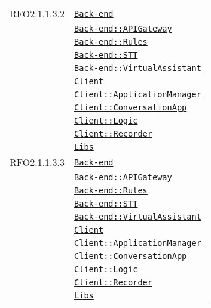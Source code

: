 \begin{longtable}{|>{\centering}m{3cm}|m{10cm}<{\centering}|}
RFO2.1.1.3.2 & \hyperref[Back-end]{\texttt{Back-end}}\\
& \hyperref[Back-end::APIGateway]{\texttt{Back-end::APIGateway}}\\
& \hyperref[Back-end::Rules]{\texttt{Back-end::Rules}}\\
& \hyperref[Back-end::STT]{\texttt{Back-end::STT}}\\
& \hyperref[Back-end::VirtualAssistant]{\texttt{Back-end::VirtualAssistant}}\\
& \hyperref[Client]{\texttt{Client}}\\
& \hyperref[Client::ApplicationManager]{\texttt{Client::ApplicationManager}}\\
& \hyperref[Client::ConversationApp]{\texttt{Client::ConversationApp}}\\
& \hyperref[Client::Logic]{\texttt{Client::Logic}}\\
& \hyperref[Client::Recorder]{\texttt{Client::Recorder}}\\
& \hyperref[Libs]{\texttt{Libs}}\\ \hline

RFO2.1.1.3.3 & \hyperref[Back-end]{\texttt{Back-end}}\\
& \hyperref[Back-end::APIGateway]{\texttt{Back-end::APIGateway}}\\
& \hyperref[Back-end::Rules]{\texttt{Back-end::Rules}}\\
& \hyperref[Back-end::STT]{\texttt{Back-end::STT}}\\
& \hyperref[Back-end::VirtualAssistant]{\texttt{Back-end::VirtualAssistant}}\\
& \hyperref[Client]{\texttt{Client}}\\
& \hyperref[Client::ApplicationManager]{\texttt{Client::ApplicationManager}}\\
& \hyperref[Client::ConversationApp]{\texttt{Client::ConversationApp}}\\
& \hyperref[Client::Logic]{\texttt{Client::Logic}}\\
& \hyperref[Client::Recorder]{\texttt{Client::Recorder}}\\
& \hyperref[Libs]{\texttt{Libs}}\\ \hline


\end{longtable}
